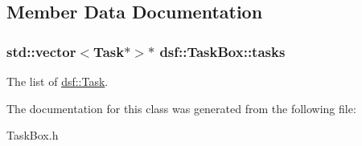 \subsection{Member Data Documentation}
\hypertarget{classdsf_1_1_task_box_ae13d0d245cacbf7f4019f7ff5486aa79}{}
\subsubsection[{tasks}]{\setlength{\rightskip}{0pt plus 5cm}std\+::vector$<${\bf Task}$\ast$$>$$\ast$ dsf\+::\+Task\+Box\+::tasks\hspace{0.3cm}{\ttfamily [protected]}}\label{classdsf_1_1_task_box_ae13d0d245cacbf7f4019f7ff5486aa79}
The list of \hyperlink{classdsf_1_1_task}{dsf\+::\+Task}. 

The documentation for this class was generated from the following file\+:\begin{DoxyCompactItemize}
\item 
Task\+Box.\+h\end{DoxyCompactItemize}
